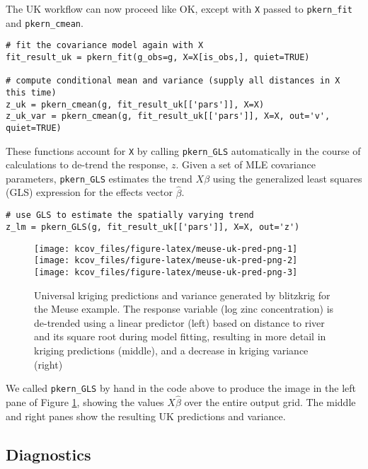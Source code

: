 The UK workflow can now proceed like OK, except with \texttt{X} passed to \texttt{pkern\_fit} and \texttt{pkern\_cmean}.

\begin{verbatim}
# fit the covariance model again with X
fit_result_uk = pkern_fit(g_obs=g, X=X[is_obs,], quiet=TRUE)

# compute conditional mean and variance (supply all distances in X this time)
z_uk = pkern_cmean(g, fit_result_uk[['pars']], X=X)
z_uk_var = pkern_cmean(g, fit_result_uk[['pars']], X=X, out='v', quiet=TRUE)
\end{verbatim}

These functions account for \texttt{X} by calling \texttt{pkern\_GLS} automatically in the course of calculations to de-trend the response, \(z\). Given a set of MLE covariance parameters, \texttt{pkern\_GLS} estimates the trend \(X\beta\) using the generalized least squares (GLS) expression for the effects vector \(\hat{\beta}\).

\begin{verbatim}
# use GLS to estimate the spatially varying trend 
z_lm = pkern_GLS(g, fit_result_uk[['pars']], X=X, out='z')
\end{verbatim}

\begin{figure}
\texttt{[image: kcov\_files/figure-latex/meuse-uk-pred-png-1]} \texttt{[image: kcov\_files/figure-latex/meuse-uk-pred-png-2]} \texttt{[image: kcov\_files/figure-latex/meuse-uk-pred-png-3]} \caption{Universal kriging predictions and variance generated by blitzkrig for the Meuse example. The response variable (log zinc concentration) is de-trended using a linear predictor (left) based on distance to river and its square root during model fitting, resulting in more detail in kriging predictions (middle), and a decrease in kriging variance (right)}\label{fig:meuse-uk-pred-png}
\end{figure}

We called \texttt{pkern\_GLS} by hand in the code above to produce the image in the left pane of Figure \ref{fig:meuse-uk-pred-png}, showing the values \(X\hat{\beta}\) over the entire output grid. The middle and right panes show the resulting UK predictions and variance.

\hypertarget{diagnostics}{%
\subsection{Diagnostics}\label{diagnostics}}

